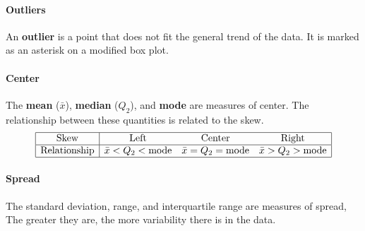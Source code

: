 \documentclass[../AP_Statistics.tex]{subfiles}
\begin{document}
				\paragraph{Outliers}
					An \textbf{outlier} is a point that does not fit the general trend of the data. It is marked as an asterisk on a modified box plot. \\
				\paragraph{Center}
					The \textbf{mean} ($\bar{x}$), \textbf{median} ($Q_2$), and \textbf{mode} are measures of center. The relationship between these quantities is related to the skew.
					$$\begin{array}{|c|ccc|}\hline
						\rm{Skew} & \rm{Left} & \rm{Center} & \rm{Right} \\\hline
						\rm{Relationship} & \bar{x} < Q_2 < \rm{mode} & \bar{x} = Q_2 = \rm{mode} & \bar{x} > Q_2 > \rm{mode} \\\hline
					\end{array}$$
				\paragraph{Spread}
					The standard deviation, range, and interquartile range are measures of spread, The greater they are, the more variability there is in the data.
\end{document}
